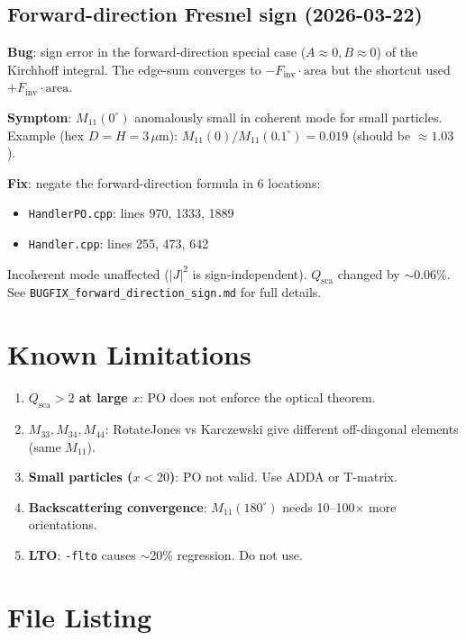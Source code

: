 \documentclass[11pt,a4paper]{article}
\begin{document}
\subsection{Forward-direction Fresnel sign (2026-03-22)}

\textbf{Bug}: sign error in the forward-direction special case ($A{\approx}0, B{\approx}0$) of the Kirchhoff integral.
The edge-sum converges to $-F_\text{inv}\cdot\text{area}$ but the shortcut used $+F_\text{inv}\cdot\text{area}$.

\textbf{Symptom}: $M_{11}(0^\circ)$ anomalously small in coherent mode for small particles.
Example (hex $D{=}H{=}3\,\mu$m): $M_{11}(0)/M_{11}(0.1^\circ) = 0.019$ (should be $\approx 1.03$).

\textbf{Fix}: negate the forward-direction formula in 6 locations:
\begin{itemize}
\item \texttt{HandlerPO.cpp}: lines 970, 1333, 1889
\item \texttt{Handler.cpp}: lines 255, 473, 642
\end{itemize}

Incoherent mode unaffected ($|J|^2$ is sign-independent).
$Q_\text{sca}$ changed by $\sim$0.06\%.
See \texttt{BUGFIX\_forward\_direction\_sign.md} for full details.

\section{Known Limitations}

\begin{enumerate}
\item \textbf{$Q_\text{sca} > 2$ at large $x$}: PO does not enforce the optical theorem.
\item \textbf{$M_{33}, M_{34}, M_{44}$}: RotateJones vs Karczewski give different off-diagonal elements (same $M_{11}$).
\item \textbf{Small particles ($x < 20$)}: PO not valid. Use ADDA or T-matrix.
\item \textbf{Backscattering convergence}: $M_{11}(180^\circ)$ needs 10--100$\times$ more orientations.
\item \textbf{LTO}: \texttt{-flto} causes $\sim$20\% regression. Do not use.
\end{enumerate}

\section{File Listing}
\end{document}
